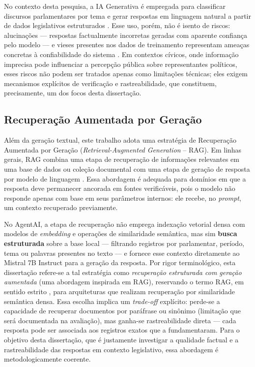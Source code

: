 No contexto desta pesquisa, a IA Generativa é empregada para classificar discursos parlamentares por tema e gerar respostas em linguagem natural a partir de dados legislativos estruturados \cite{Tamper2022}. Esse uso, porém, não é isento de riscos: alucinações — respostas factualmente incorretas geradas com aparente confiança pelo modelo — e vieses presentes nos dados de treinamento representam ameaças concretas à confiabilidade do sistema \cite{MarquesLaipelt2023}. Em contextos cívicos, onde informação imprecisa pode influenciar a percepção pública sobre representantes políticos, esses riscos não podem ser tratados apenas como limitações técnicas; eles exigem mecanismos explícitos de verificação e rastreabilidade, que constituem, precisamente, um dos focos desta dissertação.

\subsection{Recuperação Aumentada por Geração}

Além da geração textual, este trabalho adota uma estratégia de Recuperação Aumentada por Geração (\textit{Retrieval-Augmented Generation} -- RAG). Em linhas gerais, RAG combina uma etapa de recuperação de informações relevantes em uma base de dados ou coleção documental com uma etapa de geração de resposta por modelo de linguagem \cite{Lewis2020}. Essa abordagem é adequada para domínios em que a resposta deve permanecer ancorada em fontes verificáveis, pois o modelo não responde apenas com base em seus parâmetros internos: ele recebe, no \textit{prompt}, um contexto recuperado previamente.

No AgentAI, a etapa de recuperação não emprega indexação vetorial densa com modelos de \textit{embedding} e operações de similaridade semântica, mas sim \textbf{busca estruturada} sobre a base local --- filtrando registros por parlamentar, período, tema ou palavras presentes no texto --- e fornece esse contexto diretamente ao Mistral 7B Instruct para a geração da resposta. Por rigor terminológico, esta dissertação refere-se a tal estratégia como \textit{recuperação estruturada com geração aumentada} (uma abordagem inspirada em RAG), reservando o termo RAG, em sentido estrito \cite{Lewis2020}, para arquiteturas que realizam recuperação por similaridade semântica densa. Essa escolha implica um \textit{trade-off} explícito: perde-se a capacidade de recuperar documentos por paráfrase ou sinônimo (limitação que será documentada na avaliação), mas ganha-se rastreabilidade direta --- cada resposta pode ser associada aos registros exatos que a fundamentaram. Para o objetivo desta dissertação, que é justamente investigar a qualidade factual e a rastreabilidade das respostas em contexto legislativo, essa abordagem é metodologicamente coerente.

